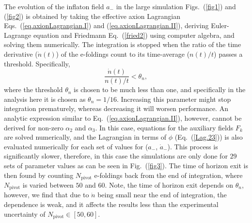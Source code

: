 \documentclass[a4paper,11pt]{article}
\begin{document}
  The evolution of the inflaton field $a_-$ in the large simulation Figs.~(\ref{fig1}) and (\ref{fig2}) is obtained by taking the effective axion Lagrangian Eqs.~(\ref{eq.axionLagrangian.I}) and (\ref{eq.axionLagrangian.II}), deriving Euler-Lagrange equation and Friedmann Eq.~(\ref{fried2}) using computer algebra, and solving them numerically. The integration is stopped when the ratio of the time derivative ($\dot n\left(t\right)$) of the e-foldings count to its time-average ($n\left(t\right) / t$) passes a threshold. Specifically,
  \begin{equation} 
  	\frac{\dot n \left(t\right)}{n\left(t\right) / t} < \theta_n,
  \end{equation} 
  where the threshold $\theta_n$ is chosen to be much less than one, and specifically
   in the analysis here it is chosen as $\theta_n = 1 / 16$. Increasing this parameter might stop integration prematurely, whereas decreasing it will worsen performance.
  An analytic expression similar to Eq.~(\ref{eq.axionLagrangian.II}), however,  cannot be derived  for  non-zero $\alpha_2$ and $\alpha_3$. In this case,  equations for the auxiliary fields $F_k$ are  solved numerically,  and the Lagrangian in terms of $\phi$ (Eq.~(\ref{Lag.23})) is
  also evaluated numerically for each set of values for ($a_-$, $\dot a_-$).  
   This process is significantly slower, therefore, in this case the simulations are only done for $29$ sets of parameter values as can be seen in Fig.~(\ref{fig3}). 
    The time of horizon exit is then found by counting $N_\text{pivot}$ e-foldings back from the end of integration, where $N_\text{pivot}$ is varied between $50$ and $60$. Note, the time of horizon exit depends on $\theta_n$, however, we find that due to $\dot n$ being small near the end of integration, the dependence is weak, and it affects the results less than the experimental uncertainty of $N_\text{pivot} \in \left[50, 60\right]$.{}
\end{document}
